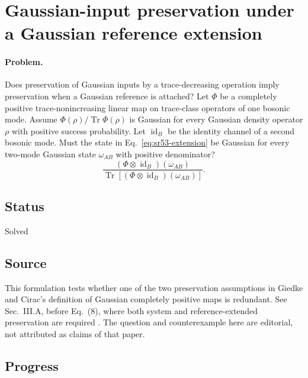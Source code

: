 \section{Gaussian-input preservation under a Gaussian reference extension}
\label{sec:op_71026fbfd41a90c6}

\paragraph{Problem.}
Does preservation of Gaussian inputs by a trace-decreasing operation imply preservation when a Gaussian reference is attached?
Let $\Phi$ be a completely positive trace-nonincreasing linear map on trace-class operators of one bosonic mode.
Assume $\Phi(\rho)/\operatorname{Tr}\Phi(\rho)$ is Gaussian for every Gaussian density operator $\rho$ with positive success probability.
Let $\operatorname{id}_B$ be the identity channel of a second bosonic mode.
Must the state in Eq.~\eqref{eq:sr53-extension} be Gaussian for every two-mode Gaussian state $\omega_{AB}$ with positive denominator?
\begin{equation}
\frac{(\Phi\otimes\operatorname{id}_B)(\omega_{AB})}{\operatorname{Tr}[(\Phi\otimes\operatorname{id}_B)(\omega_{AB})]}.
\label{eq:sr53-extension}
\end{equation}

\subsection*{Status}

Solved

\subsection*{Source}

This formulation tests whether one of the two preservation assumptions in Giedke and Cirac's definition of Gaussian completely positive maps is redundant. See Sec.~III.A, before Eq.~(8), where both system and reference-extended preservation are required . The question and counterexample here are editorial, not attributed as claims of that paper.

\subsection*{Progress}

